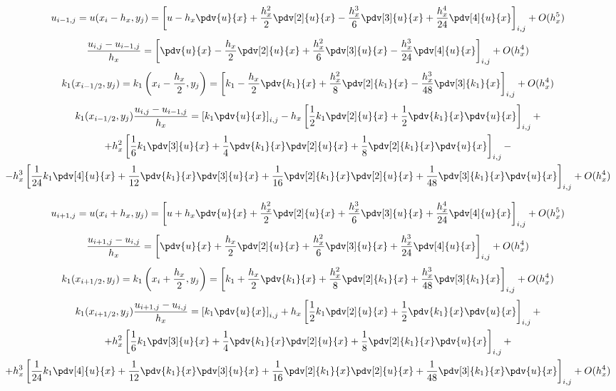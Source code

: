 \[
    u_{i-1,j} = u(x_{i} - h_x, y_{j}) = \left[ u - h_x \pdv{u}{x} + \frac{h_x^2}{2} \pdv[2]{u}{x} -
    \frac{h_x^3}{6} \pdv[3]{u}{x} + \frac{h_x^4}{24} \pdv[4]{u}{x} \right]_{i,j} + O(h_x^5)
\]
\[
    \frac{u_{i,j} - u_{i-1,j}}{h_x} = \left[ \pdv{u}{x} - \frac{h_x}{2} \pdv[2]{u}{x} +
    \frac{h_x^2}{6} \pdv[3]{u}{x} - \frac{h_x^3}{24} \pdv[4]{u}{x} \right]_{i,j} + O(h_x^4)
\]
\[
    k_1(x_{i-1/2},y_{j}) = k_1 \left( x_{i} - \frac{h_x}{2},y_{j} \right) = \left[
        k_1 - \frac{h_x}{2} \pdv{k_1}{x} + \frac{h_x^2}{8} \pdv[2]{k_1}{x} - \frac{h_x^3}{48} \pdv[3]{k_1}{x}
    \right]_{i,j} + O(h_x^4)
\]
\begin{multline*}
    k_1(x_{i-1/2},y_{j}) \frac{u_{i,j} - u_{i-1,j}}{h_x} = \left[ k_1 \pdv{u}{x} \right]_{i,j} -
    h_x \left[ \frac{1}{2} k_1 \pdv[2]{u}{x} + \frac{1}{2} \pdv{k_1}{x} \pdv{u}{x} \right]_{i,j} + \\
    + h_x^2 \left[ \frac{1}{6} k_1 \pdv[3]{u}{x} + \frac{1}{4} \pdv{k_1}{x} \pdv[2]{u}{x} + \frac{1}{8} \pdv[2]{k_1}{x} \pdv{u}{x} \right]_{i,j} - \\
    - h_x^3 \left[ \frac{1}{24} k_1 \pdv[4]{u}{x} + \frac{1}{12} \pdv{k_1}{x} \pdv[3]{u}{x} + \frac{1}{16} \pdv[2]{k_1}{x} \pdv[2]{u}{x} + \frac{1}{48} \pdv[3]{k_1}{x} \pdv{u}{x} \right]_{i,j} + O(h_x^4)
\end{multline*}

\[
    u_{i+1,j} = u(x_{i} + h_x, y_{j}) = \left[ u + h_x \pdv{u}{x} + \frac{h_x^2}{2} \pdv[2]{u}{x} +
    \frac{h_x^3}{6} \pdv[3]{u}{x} + \frac{h_x^4}{24} \pdv[4]{u}{x} \right]_{i,j} + O(h_x^5)
\]
\[
    \frac{u_{i+1,j} - u_{i,j}}{h_x} = \left[ \pdv{u}{x} + \frac{h_x}{2} \pdv[2]{u}{x} +
    \frac{h_x^2}{6} \pdv[3]{u}{x} + \frac{h_x^3}{24} \pdv[4]{u}{x} \right]_{i,j} + O(h_x^4)
\]
\[
    k_1(x_{i+1/2},y_{j}) = k_1 \left( x_{i} + \frac{h_x}{2},y_{j} \right) = \left[
        k_1 + \frac{h_x}{2} \pdv{k_1}{x} + \frac{h_x^2}{8} \pdv[2]{k_1}{x} + \frac{h_x^3}{48} \pdv[3]{k_1}{x}
    \right]_{i,j} + O(h_x^4)
\]
\begin{multline*}
    k_1(x_{i+1/2},y_{j}) \frac{u_{i+1,j} - u_{i,j}}{h_x} = \left[ k_1 \pdv{u}{x} \right]_{i,j} +
    h_x \left[ \frac{1}{2} k_1 \pdv[2]{u}{x} + \frac{1}{2} \pdv{k_1}{x} \pdv{u}{x} \right]_{i,j} + \\
    + h_x^2 \left[ \frac{1}{6} k_1 \pdv[3]{u}{x} + \frac{1}{4} \pdv{k_1}{x} \pdv[2]{u}{x} + \frac{1}{8} \pdv[2]{k_1}{x} \pdv{u}{x} \right]_{i,j} + \\
    + h_x^3 \left[ \frac{1}{24} k_1 \pdv[4]{u}{x} + \frac{1}{12} \pdv{k_1}{x} \pdv[3]{u}{x} + \frac{1}{16} \pdv[2]{k_1}{x} \pdv[2]{u}{x} + \frac{1}{48} \pdv[3]{k_1}{x} \pdv{u}{x} \right]_{i,j} + O(h_x^4)
\end{multline*}

